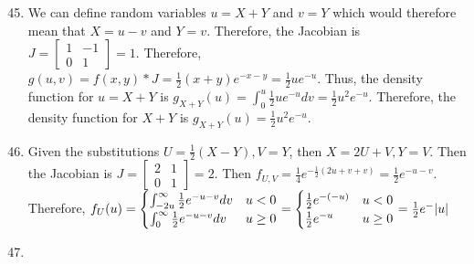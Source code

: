 \documentclass{article}
\begin{document}
\begin{enumerate}
    \setcounter{enumi}{44}
    \item
    
    We can define random variables $u=X+Y$ and $v=Y$ which would therefore mean that $X=u-v$ and $Y=v$. Therefore, the Jacobian is $J=\begin{bmatrix}
    1 & -1\\
    0 & 1
    \end{bmatrix}=1.$ Therefore, $g(u, v)=f(x, y)*J=\frac{1}{2}(x+y)e^{-x-y}=\frac{1}{2}ue^{-u}$. Thus, the density function for $u=X+Y$ is $g_{X+Y}(u)=\int_0^u\frac{1}{2}ue^{-u}dv=\frac{1}{2}u^2e^{-u}$. Therefore, the density function for $X+Y$ is $g_{X+Y}(u)=\frac{1}{2}u^2e^{-u}.$
    
    \setcounter{enumi}{54}
    \item
    
    Given the substitutions $U=\frac{1}{2}(X-Y), V=Y$, then $X=2U+V, Y=V$. Then the Jacobian is $J=\begin{bmatrix}
    2 & 1\\
    0 & 1
    \end{bmatrix}=2$. Then $f_{U,V}=\frac{1}{4}e^{-\frac{1}{2}(2u+v+v)}=\frac{1}{2}e^{-u-v}$. Therefore, $f_U(u) = 
\begin{cases}
\int_{-2u}^{\infty}\frac{1}{2}e^{-u-v}dv & u<0 \crcr
\int_0^{\infty}\frac{1}{2}e^{-u-v}dv & u\geq 0
\end{cases} = \begin{cases}
\frac{1}{2}e^{-(-u)} & u<0\crcr
\frac{1}{2}e^{-u} & u\geq 0
\end{cases}=\frac{1}{2}e^-|u|$
    
    \setcounter{enumi}{60}
    \item
    

\end{enumerate}
\end{document}
